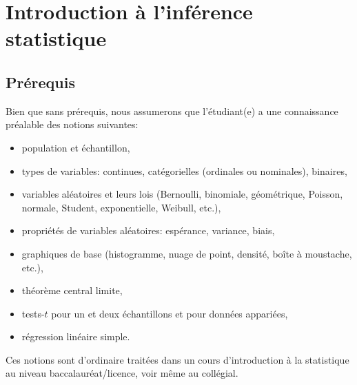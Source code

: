 \documentclass[
  11pt,
  letterpaper,
]{book}
\providecommand{\tightlist}{%
  \setlength{\itemsep}{0pt}\setlength{\parskip}{0pt}}
\begin{document}
\newcommand{\bs}[1]{\boldsymbol{#1}}
\newcommand{\Hmat}{\mathbf{H}}
\newcommand{\Mmat}{\mathbf{M}}
\newcommand{\mX}{\mathbf{X}}
\newcommand{\bX}{{\mathbf{X}}}
\newcommand{\bx}{{\mathbf{x}}}
\newcommand{\by}{{\boldsymbol{y}}}
\newcommand{\bY}{{\boldsymbol{Y}}}
\newcommand{\eps}{\varepsilon}
\newcommand{\beps}{\boldsymbol{\varepsilon}}
\newcommand{\bbeta}{\boldsymbol{\beta}}
\newcommand{\hbb}{\widehat{\boldsymbol{\beta}}}
\newcommand{\limni}{\lim_{n \ra \infty}}
\newcommand{\pr}{{\mathsf Pr}{}}
\newcommand{\E}[2][]{{\mathsf E}_{#1}\left(#2\right)}
\newcommand{\Va}[2][]{{\mathsf{Var}_{#1}}\left(#2\right)}
\newcommand{\I}[1]{{\mathbf 1}_{#1}}
\renewcommand{\d}{\mathrm{d}}

\hypertarget{intro}{%
\chapter{Introduction à l'inférence statistique}\label{intro}}

\hypertarget{pruxe9requis}{%
\section{Prérequis}\label{pruxe9requis}}

Bien que sans prérequis, nous assumerons que l'étudiant(e) a une connaissance préalable des notions suivantes:

\begin{itemize}
\tightlist
\item
  population et échantillon,
\item
  types de variables: continues, catégorielles (ordinales ou nominales), binaires,
\item
  variables aléatoires et leurs lois (Bernoulli, binomiale, géométrique, Poisson, normale, Student, exponentielle, Weibull, etc.),
\item
  propriétés de variables aléatoires: espérance, variance, biais,
\item
  graphiques de base (histogramme, nuage de point, densité, boîte à moustache, etc.),
\item
  théorème central limite,
\item
  tests-\(t\) pour un et deux échantillons et pour données appariées,
\item
  régression linéaire simple.
\end{itemize}

Ces notions sont d'ordinaire traitées dans un cours d'introduction à la statistique au niveau baccalauréat/licence, voir même au collégial.
\end{document}
